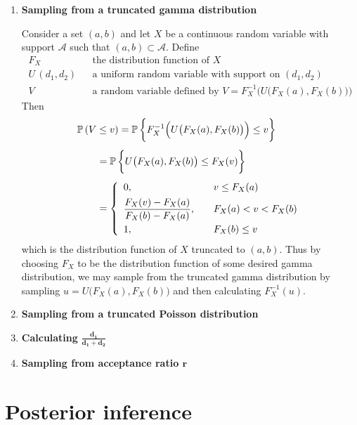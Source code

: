 \documentclass[11pt]{article}
\newcommand{\prob}{\mathbb{P}\,}
\begin{document}
\begin{enumerate}[label=(\roman*), itemsep=10mm]
\item \textbf{Sampling from a truncated gamma distribution}

Consider a set $(a,b)$ and let $X$ be a continuous random variable with support $\mathcal{A}$ such that $(a,b) \subset \mathcal{A}$.  Define
\[ \begin{array}{lll}
F_X & & \text{the distribution function of $X$} \\[1ex]
U\,(d_1,d_2) & & \text{a uniform random variable with support on $(d_1,d_2)$} \\[1ex]
V & & \text{a random variable defined by $V = F_X^{-1}\Big( U\big( F_X(a), F_X(b) \big) \Big)$}
\end{array} \]
Then
\begin{align*} \MoveEqLeft
\prob(V \leq v) = \prob \bigg\{ F_X^{-1}\Big( U\big( F_X(a), F_X(b) \big) \Big) \leq v \bigg\} \\[1ex]
&= \prob \bigg\{ U\big( F_X(a), F_X(b) \big) \leq F_X(v) \bigg\} \\[1ex]
&= \left\{ \begin{array}{lll}
0, & & v \leq F_X(a) \\[1ex]
\displaystyle \frac{ F_X(v) - F_X(a) }{ F_X(b) - F_X(a) }, & & F_X(a) < v < F_X(b) \\[2ex]
1, & & F_X(b) \leq v
\end{array} \right. \end{align*}
which is the distribution function of $X$ truncated to $(a,b)$.  Thus by choosing $F_X$ to be the distribution function of some desired gamma distribution, we may sample from the truncated gamma distribution by sampling $u = U\big( F_X(a), F_X(b) \big)$ and then calculating $F_X^{-1}(u)$. 


\item \textbf{Sampling from a truncated Poisson distribution}

\item \textbf{Calculating } $\displaystyle \boldsymbol{\frac{d_1}{d_1 + d_2}}$

\item \textbf{Sampling from acceptance ratio $\boldsymbol{r}$}

\end{enumerate}







\section{Posterior inference}
\end{document}
